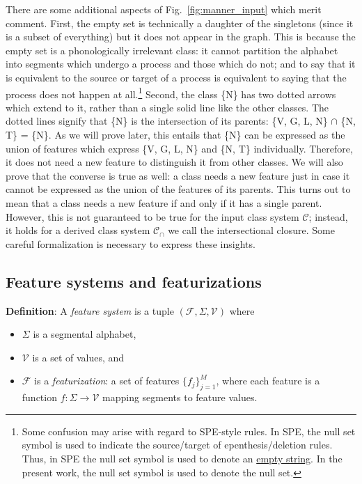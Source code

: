 \documentclass[11pt, oneside]{article}   	%
\begin{document}
There are some additional aspects of Fig.~\ref{fig:manner_input} which merit comment. First, the empty set is technically a daughter of the singletons (since it is a subset of everything) but it does not appear in the graph. This is because the empty set is a phonologically irrelevant class: it cannot partition the alphabet into segments which undergo a process and those which do not; and to say that it is equivalent to the source or target of a process is equivalent to saying that the process does not happen at all.\footnote{Some confusion may arise with regard to SPE-style rules. In SPE, the null set symbol is used to indicate the source/target of epenthesis/deletion rules. Thus, in SPE the null set symbol is used to denote an \underline{empty string}. In the present work, the null set symbol is used to denote the null set.} Second, the class \{N\} has two dotted arrows which extend to it, rather than a single solid line like the other classes. The dotted lines signify that \{N\} is the intersection of its parents: \{V, G, L, N\} $\cap$ \{N, T\} = \{N\}. As we will prove later, this entails that \{N\} can be expressed as the union of features which express \{V, G, L, N\} and \{N, T\} individually. Therefore, it does not need a new feature to distinguish it from other classes. We will also prove that the converse is true as well: a class needs a new feature just in case it cannot be expressed as the union of the features of its parents. This turns out to mean that a class needs a new feature if and only if it has a single parent. However, this is not guaranteed to be true for the input class system $\mathcal C$; instead, it holds for a derived class system $\mathcal C_\cap$ we call the intersectional closure. Some careful formalization is necessary to express these insights.

\subsection{Feature systems and featurizations}

\textbf{Definition}: A \textit{feature system} is a tuple $(\mathcal F, \Sigma, \mathcal V)$ where \begin{itemize}
    \item $\Sigma$ is a segmental alphabet, 
    \item $\mathcal V$ is a set of values, and 
    \item $\mathcal F$ is a \textit{featurization}: a set of features $\{f_j\}_{j=1}^M$, where each feature is a function $f: \Sigma \rightarrow \mathcal V$ mapping segments to feature values.
    \end{itemize}
\end{document}
